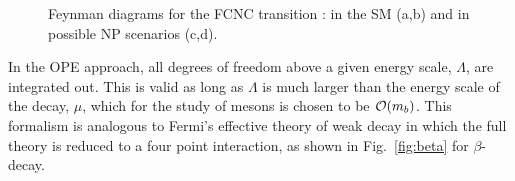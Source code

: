 \begin{figure}[!tb]
\begin{subfigure}{0.49\textwidth}
\caption{}
\label{fig:btosll:c}
\end{subfigure}
\begin{subfigure}{0.49\textwidth}
\caption{}
\label{fig:btosll:d}
\end{subfigure}
\caption{Feynman diagrams for the FCNC transition \btosll: in the SM (a,b) and in possible NP scenarios (c,d).}
\label{fig:btosll}
\end{figure}

In the OPE approach, all degrees of freedom above a given energy scale, $\Lambda$, are integrated out. This is valid as long as $\Lambda$ is much larger than the energy scale of the decay, $\mu$, which for the study of \B mesons is chosen to be ${\mathcal{O}}(m_{{b}})$. This formalism is analogous to Fermi's effective theory of weak decay in which the full theory is reduced to a four point interaction, as shown in Fig.~\ref{fig:beta} for $\beta$-decay.

